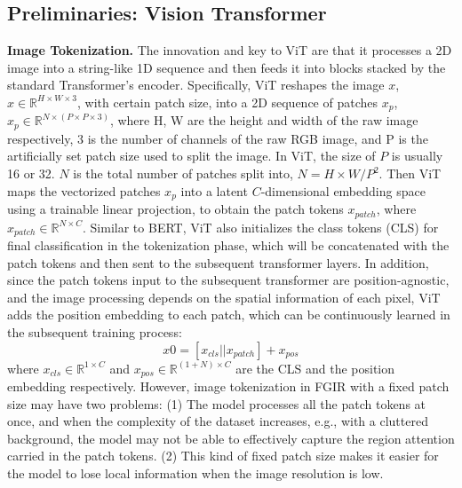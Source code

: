 \documentclass[sigconf]{acmart}
\begin{document}
\subsection{Preliminaries: Vision Transformer}
\textbf{Image Tokenization.} The innovation and key to ViT are that it processes a 2D image into a string-like 1D sequence and then feeds it into blocks stacked by the standard Transformer's encoder. Specifically, ViT reshapes the image $x$, $x \in \mathbb{R}^{H \times W \times 3}$, with certain patch size, into a 2D sequence of patches $x_p$,  $x_p \in \mathbb{R}^{N \times (P \times P \times 3)}$, where H, W are the height and width of the raw image respectively, 3 is the number of channels of the raw RGB image, and P is the artificially set patch size used to split the image. In ViT, the size of $P$ is usually 16 or 32. $N$ is the total number of patches split into, $N = H \times W /P^2$. Then ViT maps the vectorized patches $x_p$ into a latent $C$-dimensional embedding space using a trainable linear projection, to obtain the patch tokens $x_{patch}$, where $x_{patch} \in \mathbb{R}^{N\times C}$. Similar to BERT, ViT also initializes the class tokens (CLS) for final classification in the tokenization phase, which will be concatenated with the patch tokens and then sent to the subsequent transformer layers. In addition, since the patch tokens input to the subsequent transformer are position-agnostic, and the image processing depends on the spatial information of each pixel, ViT adds the position embedding to each patch, which can be continuously learned in the subsequent training process:
\begin{equation}
    x0 = [x_{cls}||x_{patch}] + x_{pos}
\end{equation}
where $x_{cls} \in \mathbb{R}^{1\times C}$ and $x_{pos} \in \mathbb{R}^{(1+N) \times C}$ are the CLS and the position embedding respectively.
However, image tokenization in FGIR with a fixed patch size may have two problems: (1) The model processes all the patch tokens at once, and when the complexity of the dataset increases, e.g., with a cluttered background, the model may not be able to effectively capture the region attention carried in the patch tokens. (2) This kind of fixed patch size makes it easier for the model to lose local information when the image resolution is low.
\end{document}
